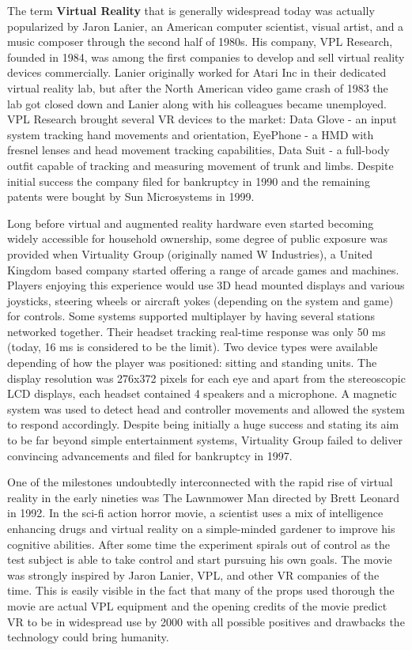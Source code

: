 \documentclass[12pt, a4paper]{article}
\begin{document}
The term \textbf{Virtual Reality} that is generally widespread today was actually popularized by Jaron Lanier, an American computer scientist, visual artist, and a music composer through the second half of 1980s. His company, VPL Research, founded in 1984, was among the first companies to develop and sell virtual reality devices commercially. Lanier originally worked for Atari Inc in their dedicated virtual reality lab, but after the North American video game crash of 1983 the lab got closed down and Lanier along with his colleagues became unemployed. VPL Research brought several VR devices to the market: Data Glove - an input system tracking hand movements and orientation, EyePhone - a HMD with fresnel lenses and head movement tracking capabilities, Data Suit - a full-body outfit capable of tracking and measuring movement of trunk and limbs. Despite initial success the company filed for bankruptcy in 1990 and the remaining patents were bought by Sun Microsystems in 1999.

Long before virtual and augmented reality hardware even started becoming widely accessible for household ownership, some degree of public exposure was provided when Virtuality Group (originally named W Industries), a United Kingdom based company started offering a range of arcade games and machines. Players enjoying this experience would use 3D head mounted displays and various joysticks, steering wheels or aircraft yokes (depending on the system and game) for controls. Some systems supported multiplayer by having several stations networked together. Their headset tracking real-time response was only 50 ms (today, 16 ms is considered to be the limit). Two device types were available depending of how the player was positioned: sitting and standing units. The display resolution was 276x372 pixels for each eye and apart from the stereoscopic LCD displays, each headset contained 4 speakers and a microphone. A magnetic system was used to detect head and controller movements and allowed the system to respond accordingly. Despite being initially a huge success and stating its aim to be far beyond simple entertainment systems, Virtuality Group failed to deliver convincing advancements and filed for bankruptcy in 1997.

One of the milestones undoubtedly interconnected with the rapid rise of virtual reality in the early nineties was The Lawnmower Man directed by Brett Leonard in 1992. In the sci-fi action horror movie, a scientist uses a mix of intelligence enhancing drugs and virtual reality on a simple-minded gardener to improve his cognitive abilities. After some time the experiment spirals out of control as the test subject is able to take control and start pursuing his own goals. The movie was strongly inspired by Jaron Lanier, VPL, and other VR companies of the time. This is easily visible in the fact that many of the props used thorough the movie are actual VPL equipment and the opening credits of the movie predict VR to be in widespread use by 2000 with all possible positives and drawbacks the technology could bring humanity.
\end{document}

